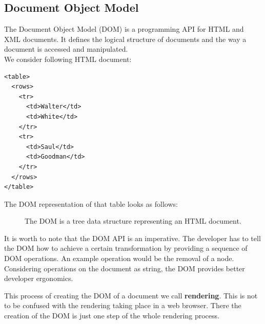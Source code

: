 \subsection{Document Object Model}\label{documentobjectmodel}

The Document Object Model (DOM) is a programming API for HTML and XML documents. It defines the logical structure of documents and the way a document is accessed and manipulated. \citep{domintro} \\ We consider following HTML document:

\lstset{language=XML}
\begin{lstlisting}[caption=HTML document of a table, label=htmloftable]
<table>
  <rows>
    <tr>
      <td>Walter</td>
      <td>White</td>
    </tr>
    <tr>
      <td>Saul</td>
      <td>Goodman</td>
    </tr>
  </rows>
</table>
\end{lstlisting}

The DOM representation of that table looks as follows:

\begin{figure}[!htb]
  \caption{\label{fig:my-label} The DOM is a tree data structure representing an HTML document.}
\end{figure}

It is worth to note that the DOM API is an imperative. The developer has to tell the DOM how to achieve a certain transformation by providing a sequence of DOM operations. An example operation would be the removal of a node. Considering operations on the document as string, the DOM provides better developer ergonomics.

This process of creating the DOM of a document we call \textbf{rendering}. This is not to be confused with the rendering taking place in a web browser. There the creation of the DOM is just one step of the whole rendering process.

